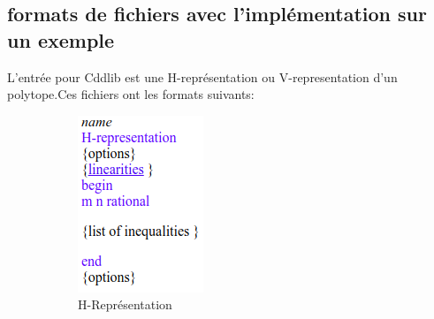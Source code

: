 \subsection{ formats de fichiers avec l'implémentation sur un exemple}
% 
% 
L’entrée pour Cddlib est une H-représentation ou V-representation d’un polytope.Ces fichiers ont les formats suivants:
 \begin{figure}[ht]
	\centering
	\begin{subfigure}{.20\textwidth}
		\includegraphics[width=\textwidth,scale=0.7]{images/H_representation.png}
		\caption{H-Représentation}
		\label{fig:h_represt}
	\end{subfigure}\hfill%
	\begin{subfigure}{.33\textwidth}

\end{subfigure}
\end{figure}
